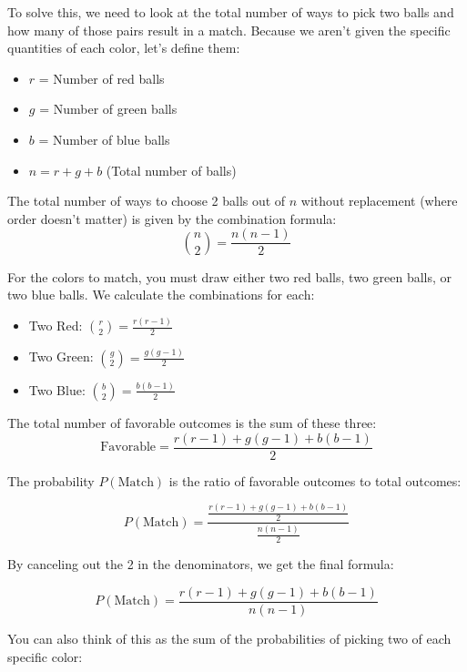 \documentclass{report}
\begin{document}
\begin{sol}
    
    To solve this, we need to look at the total number of ways to pick two balls and how many of those pairs result in a match. Because we aren't given the specific quantities of each color, let’s define them:
    \begin{itemize}
        \item $r$ = Number of red balls
        \item $g$ = Number of green balls
        \item $b$ = Number of blue balls
        \item $n = r + g + b$ (Total number of balls)
    \end{itemize}

    The total number of ways to choose 2 balls out of $n$ without replacement (where order doesn't matter) is given by the combination formula:
    $$\binom{n}{2} = \frac{n(n-1)}{2}$$



    For the colors to match, you must draw either two red balls, two green balls, or two blue balls. We calculate the combinations for each:

    \begin{itemize}
        \item Two Red: $\binom{r}{2} = \frac{r(r-1)}{2}$
        \item Two Green: $\binom{g}{2} = \frac{g(g-1)}{2}$
        \item Two Blue: $\binom{b}{2} = \frac{b(b-1)}{2}$
    \end{itemize}

    The total number of favorable outcomes is the sum of these three:
    $$\text{Favorable} = \frac{r(r-1) + g(g-1) + b(b-1)}{2}$$


    The probability $P(\text{Match})$ is the ratio of favorable outcomes to total outcomes:

    $$P(\text{Match}) = \frac{\frac{r(r-1) + g(g-1) + b(b-1)}{2}}{\frac{n(n-1)}{2}}$$

    By canceling out the 2 in the denominators, we get the final formula:

    $$P(\text{Match}) = \frac{r(r-1) + g(g-1) + b(b-1)}{n(n-1)}$$



    You can also think of this as the sum of the probabilities of picking two of each specific color:


\end{sol}
\end{document}
